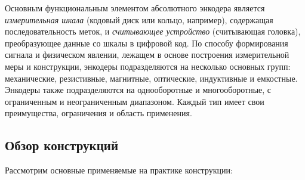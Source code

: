 Основным функциональным элементом абсолютного энкодера является \textit{измерительная шкала} (кодовый диск или кольцо, например), содержащая последовательность меток, и \textit{считывающее устройство} (считывающая головка), преобразующее данные со шкалы в цифровой код. По способу формирования сигнала и физическом явлении, лежащем в основе построения измерительной меры и конструкции, энкодеры подразделяются на несколько основных групп: механические, резистивные, магнитные, оптические, индуктивные и емкостные. Энкодеры также подразделяются на однооборотные и многооборотные, с ограниченным и неограниченным диапазоном. Каждый тип имеет свои преимущества, ограничения и область применения.  

\subsection{Обзор конструкций}
Рассмотрим основные применяемые на практике конструкции:
